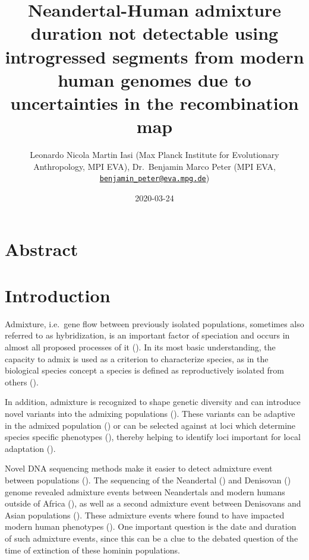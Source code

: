 \documentclass[]{article}
\title{Neandertal-Human admixture duration not detectable using introgressed
segments from modern human genomes due to uncertainties in the
recombination map}
\author{Leonardo Nicola Martin Iasi (Max Planck Institute for Evolutionary
Anthropology, MPI EVA), Dr.~Benjamin Marco Peter (MPI EVA,
\href{mailto:benjamin_peter@eva.mpg.de}{\nolinkurl{benjamin\_peter@eva.mpg.de}})}
\date{2020-03-24}
\begin{document}
\maketitle

\section{Abstract}\label{abstract}

\section{Introduction}\label{introduction}

Admixture, i.e.~gene flow between previously isolated populations,
sometimes also referred to as hybridization, is an important factor of
speciation and occurs in almost all proposed processes of it
(\cite{abbott_hybridization_2013}). In its most basic understanding, the
capacity to admix is used as a criterion to characterize species, as in
the biological species concept a species is defined as reproductively
isolated from others (\cite{mayr_animal_1963}).

In addition, admixture is recognized to shape genetic diversity and can
introduce novel variants into the admixing populations
(\cite{harrison_hybridization_2014}). These variants can be adaptive in
the admixed population (\cite{hedrick_adaptive_2013}) or can be selected
against at loci which determine species specific phenotypes
(\cite{shaw_genes_2011}), thereby helping to identify loci important for
local adaptation (\cite{payseur_using_2010}).

Novel DNA sequencing methods make it easier to detect admixture event
between populations (\cite{sousa_understanding_2013}). The sequencing of
the Neandertal (\cite{green_draft_2010}) and Denisovan
(\cite{reich_genetic_2010}) genome revealed admixture events between
Neandertals and modern humans outside of Africa
(\cite{green_draft_2010,prufer_complete_2013,vernot_resurrecting_2014,fu_early_2015,fu_genome_2014,sankararaman_genomic_2014,prufer_high-coverage_2017}),
as well as a second admixture event between Denisovans and Asian
populations
(\cite{reich_genetic_2010,meyer_high-coverage_2012,sankararaman_combined_2016,vernot_excavating_2016}).
These admixture events where found to have impacted modern human
phenotypes (\cite{dannemann_something_2018}). One important question is
the date and duration of such admixture events, since this can be a clue
to the debated question of the time of extinction of these hominin
populations.
\end{document}
